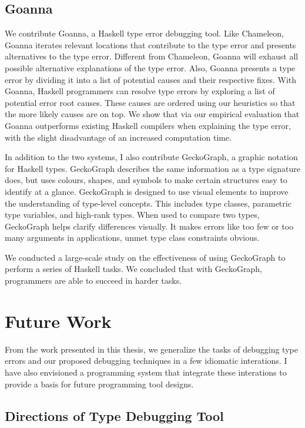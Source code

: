  
\subsection{Goanna}
We contribute Goanna, a Haskell type error debugging tool. Like Chameleon, Goanna iterates relevant locations that contribute to the type error and presents alternatives to the type error. Different from Chameleon, Goanna will exhaust all possible alternative explanations of the type error. Also, Goanna presents a type error by dividing it into a list of potential causes and their respective fixes. With Goanna, Haskell programmers can resolve type errors by exploring a list of potential error root causes. These causes are ordered using our heuristics so that the more likely causes are on top. We show that via our empirical evaluation that Goanna outperforms existing Haskell compilers when explaining the type error, with the slight disadvantage of an increased computation time.


In addition to the two systems, I also contribute GeckoGraph, a graphic notation for Haskell types. GeckoGraph describes the same information as a type signature does, but uses colours, shapes, and symbols to make certain structures easy to identify at a glance. GeckoGraph is designed to use visual elements to improve the understanding of type-level concepts. This includes type classes, parametric type variables, and high-rank types. When used to compare two types, GeckoGraph helps clarify differences visually. It makes errors like too few or too many arguments in applications, unmet type class constraints obvious.


We conducted a large-scale study on the effectiveness of using GeckoGraph to perform a series of Haskell tasks. We concluded that with GeckoGraph, programmers are able to succeed in harder tasks.



\section{Future Work}

From the work presented in this thesis, we generalize the tasks of debugging type errors and our proposed debugging techniques in a few idiomatic interations.  I have also envisioned a programming system that integrate these interations to provide a basis for future programming tool designs.

\subsection{Directions of Type Debugging Tool}

